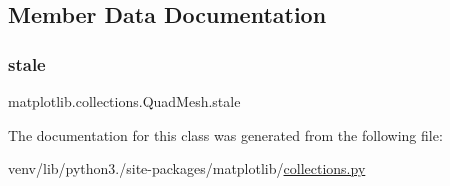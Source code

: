 \subsection{Member Data Documentation}
\mbox{\label{classmatplotlib_1_1collections_1_1QuadMesh_aeaa9b40936df1d30561e881bb0ac736e}} 
\subsubsection{\texorpdfstring{stale}{stale}}
{\footnotesize\ttfamily matplotlib.\+collections.\+Quad\+Mesh.\+stale}



The documentation for this class was generated from the following file\+:\begin{DoxyCompactItemize}
\item 
venv/lib/python3./site-\/packages/matplotlib/\hyperlink{collections_8py}{collections.\+py}\end{DoxyCompactItemize}
